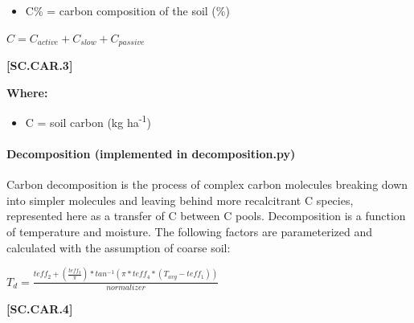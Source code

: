         \begin{itemize}
            \item C\% = carbon composition of the soil (\%)
        \end{itemize}
        \vspace{0.5cm}

    \begin{center}
\(C=C_{active}+C_{slow}+C_{passive}\)
\vspace{0.1cm}

    \end{center}
        \vspace{0.5cm} 
    
            {\raggedleft \textbf{[SC.CAR.3]}\par}
            \vspace{0.5cm}

        \textbf{Where:}
            
        \begin{itemize}
            \item C = soil carbon (kg ha\textsuperscript{-1})

        \end{itemize}
        \vspace{0.5cm}

\paragraph{Decomposition (implemented in decomposition.py)}
\vspace{0.2cm}

Carbon decomposition is the process of complex carbon molecules breaking down into simpler molecules and leaving behind more recalcitrant C species, represented here as a transfer of C between C pools. Decomposition is a function of temperature and moisture. The following factors are parameterized and calculated with the assumption of coarse soil:
            \vspace{0.5cm}

    \begin{center}
\(T_d=\frac{teff_2+(\frac{teff_3}{\pi}) * tan ^{-1}(\pi * teff_4 * (T_{avg}-teff_1))}{normalizer}\)
    \end{center}
        \vspace{0.5cm} 
    
            {\raggedleft \textbf{[SC.CAR.4]}\par}
            \vspace{0.5cm}

